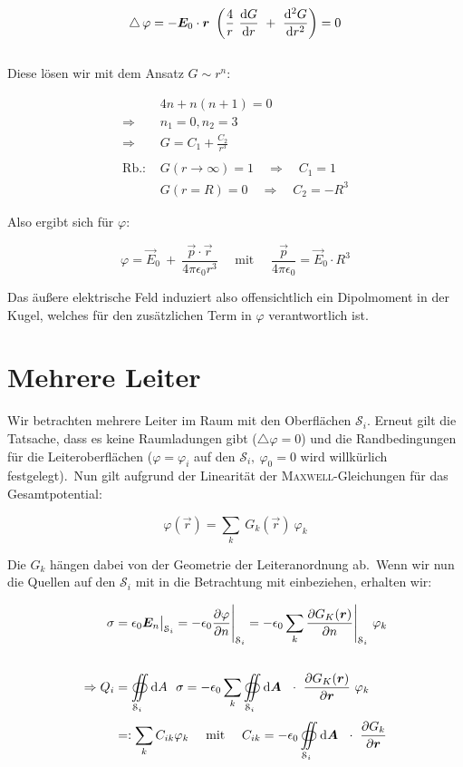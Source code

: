 \begin{equation*}
\mathop{{}\bigtriangleup}\nolimits\varphi = -\bm{E}_0\cdot\bm{r} \ \left(\frac{4}{r} \ \frac{\mathrm{d}{G}}{\mathrm{d}{r}} \ + \ \frac{\mathrm{d}^2{G}}{\mathrm{d}{r}^2}\right) = 0
\end{equation*}
\ \\
Diese lösen wir mit dem Ansatz $ G \sim r^n$:


\begin{align*}
& 4n + n(n+1) = 0\\
\Rightarrow & n_1 = 0, n_2=3\\
\Rightarrow & G = C_1 + \frac{C_2}{r^3}\\
\ \\
\text{Rb.: } & G(r\rightarrow\infty) = 1 \quad \Rightarrow \quad C_1 = 1\\
& G(r=R) = 0 \quad \Rightarrow \quad C_2 = -R^3 
\end{align*}

Also ergibt sich für $\varphi$:

\begin{equation*}
\varphi = \vec{E}_0 \ + \ \frac{\vec{p} \cdot\vec{r}}{4\pi\epsilon_0 r^3} \quad
 \text{ mit } \quad \frac{\vec{p}}{4\pi\epsilon_0} = \vec{E}_0 \cdot R^3
\end{equation*}

Das äußere elektrische Feld induziert also offensichtlich ein Dipolmoment in der Kugel, welches für den zusätzlichen Term in $\varphi$ verantwortlich ist.

\section{Mehrere Leiter}

Wir betrachten mehrere Leiter im Raum mit den Oberflächen $\mathcal{S}_i$. Erneut gilt die Tatsache, dass es keine Raumladungen gibt ($\bigtriangleup\varphi = 0$) und die Randbedingungen für die Leiteroberflächen ($\varphi = \varphi_i$ auf den $\mathcal{S}_i, \ \varphi_0 = 0$ wird willkürlich festgelegt).\
Nun gilt aufgrund der Linearität der \textsc{Maxwell}-Gleichungen für das Gesamtpotential:

\begin{equation*}
\varphi (\vec{r}) = \sum_k \ G_k(\vec{r}) \ \varphi_k
\end{equation*}

Die $G_k$ hängen dabei von der Geometrie der Leiteranordnung ab.\
Wenn wir nun die Quellen auf den $\mathcal{S}_i$ mit in die Betrachtung mit einbeziehen, erhalten wir: 

\begin{align*}
\sigma &= \epsilon_0 \vec{E}_n\big|_{\mathcal{S}_i}  = -\epsilon_0 \pdiff{\varphi}{n}\Bigg|_{\mathcal{S}_i} = - \epsilon_0 \sum_k \pdiff{G_K(\vec{r})}{n}\Bigg|_{\mathcal{S}_i} \ \varphi_k \\
\ \\
\Rightarrow Q_i &= \Oiint{\mathcal{S}_i}{}{A} \ \sigma = -\epsilon_0\sum_k\Oiint{\mathcal{S}_i}{}{\vec{A}}\  \cdot \ \pdiff{G_K(\vec{r})}{\vec{r}} \ \varphi_k\\
&=: \sum_k C_{ik} \varphi_k \quad \text{ mit } \quad C_{ik} = -\epsilon_0 \Oiint{\mathcal{S}_i}{}{\vec{A}} \ \cdot \ \pdiff{G_k}{\vec{r}}
\end{align*}


